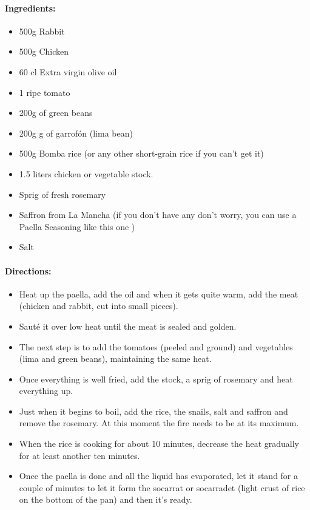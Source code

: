 \documentclass{article}
\begin{document}
\paragraph{Ingredients:}
\begin{itemize}
    \item 500g Rabbit
    \item 500g Chicken
    \item 60 cl Extra virgin olive oil
    \item 1 ripe tomato
    \item 200g of green beans
    \item 200g g of garrofón (lima bean)
    \item 500g Bomba rice (or any other short-grain rice if you can’t get it)
    \item 1.5 liters chicken or vegetable stock.
    \item Sprig of fresh rosemary
    \item Saffron from La Mancha (if you don’t have any don’t worry, you can use a Paella Seasoning like this one )
    \item Salt
\end{itemize}

\paragraph{Directions:}
\begin{itemize}
    \item Heat up the paella, add the oil and when it gets quite warm, add the meat (chicken and rabbit, cut into small pieces).
    \item Sauté it over low heat until the meat is sealed and golden.
    \item The next step is to add the tomatoes (peeled and ground) and vegetables (lima and green beans), maintaining the same heat.
    \item Once everything is well fried, add the stock, a sprig of rosemary and heat everything up.
    \item Just when it begins to boil, add the rice, the snails, salt and saffron and remove the rosemary. At this moment the fire needs to be at its maximum.
    \item When the rice is cooking for about 10 minutes, decrease the heat gradually for at least another ten minutes.
    \item Once the paella is done and all the liquid has evaporated, let it stand for a couple of minutes to let it form the socarrat or socarradet (light crust of rice on the bottom of the pan) and then it’s ready.
\end{itemize}
\end{document}
